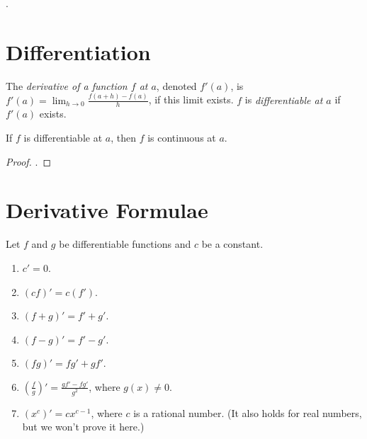         \begin{defn} \label{def_continuous_R}
            .
        \end{defn}
    
    \section{Differentiation}
    
        \begin{defn}[Derivative] \label{def_derivative}
            The \emph{derivative of a function $f$ at $a$}, denoted $f'(a)$, is $f'(a)=\displaystyle\lim_{h \to 0} \frac{f(a+h)-f(a)}{h}$, if this limit exists. $f$ is \emph{differentiable at $a$} if $f'(a)$ exists.
        \end{defn}
        
        \begin{thm} \label{thm_diff_cont}
            If $f$ is differentiable at $a$, then $f$ is continuous at $a$.
        \end{thm}
        
        \begin{proof}
            .
        \end{proof}
    
    \section{Derivative Formulae}
    
        \begin{thm} \label{thm_derivative}
            Let $f$ and $g$ be differentiable functions and $c$ be a constant. \begin{enumerate}
                \item $c' = 0$.
                \item $(cf)' = c(f')$.
                \item $(f+g)' = f'+g'$.
                \item $(f-g)' = f'-g'$.
                \item $(fg)' = fg'+gf'$.
                \item $(\frac{f}{g})' = \frac{gf'-fg'}{g^2}$, where $g(x) \neq 0$.
                \item $(x^c)' = cx^{c-1}$, where $c$ is a rational number. (It also holds for real numbers, but we won't prove it here.)
            \end{enumerate}
        \end{thm}
        
